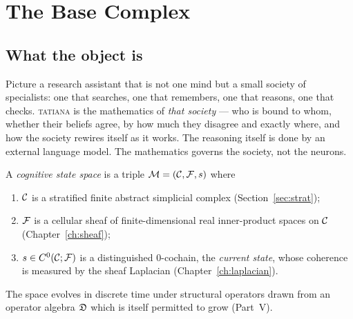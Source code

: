 
\chapter{The Base Complex}\label{ch:complex}

\section{What the object is}

\begin{intu}\Intu
Picture a research assistant that is not one mind but a small society of
specialists: one that searches, one that remembers, one that reasons, one
that checks. \textsc{tatiana} is the mathematics of \emph{that society} ---
who is bound to whom, whether their beliefs agree, by how much they
disagree and exactly where, and how the society rewires itself as it
works. The reasoning itself is done by an external language model. The
mathematics governs the society, not the neurons.
\end{intu}

\begin{definition}\label{def:M}
A \emph{cognitive state space} is a triple $\mathcal{M}=(\mathcal{C},\mathcal{F},s)$ where
\begin{enumerate}[label=(\roman*)]
  \item $\mathcal{C}$ is a stratified finite abstract simplicial complex
        (Section~\ref{sec:strat});
  \item $\mathcal{F}$ is a cellular sheaf of finite-dimensional real
        inner-product spaces on $\mathcal{C}$ (Chapter~\ref{ch:sheaf});
  \item $s\in C^{0}(\mathcal{C};\mathcal{F})$ is a distinguished $0$-cochain, the \emph{current
        state}, whose coherence is measured by the sheaf Laplacian
        (Chapter~\ref{ch:laplacian}).
\end{enumerate}
The space evolves in discrete time under structural operators drawn from
an operator algebra $\mathfrak{D}$ which is itself permitted to grow
(Part~V).
\end{definition}


